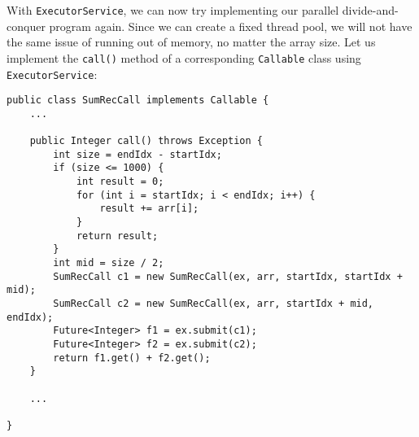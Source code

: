 \documentclass[main.tex]{subfiles}
\begin{document}
With \texttt{ExecutorService}, we can now try implementing our parallel divide-and-conquer program again. Since we can create a fixed thread pool, we will not have the same issue of running out of memory, no matter the array size. Let us implement the \texttt{call()} method of a corresponding \texttt{Callable} class using \texttt{ExecutorService}:
\begin{verbatim}
public class SumRecCall implements Callable {
    ...

    public Integer call() throws Exception {
        int size = endIdx - startIdx;
        if (size <= 1000) {
            int result = 0;
            for (int i = startIdx; i < endIdx; i++) {
                result += arr[i];
            }
            return result;
        }
        int mid = size / 2;
        SumRecCall c1 = new SumRecCall(ex, arr, startIdx, startIdx + mid);
        SumRecCall c2 = new SumRecCall(ex, arr, startIdx + mid, endIdx);
        Future<Integer> f1 = ex.submit(c1);
        Future<Integer> f2 = ex.submit(c2);
        return f1.get() + f2.get();
    }

    ...

}
\end{verbatim}
\end{document}
